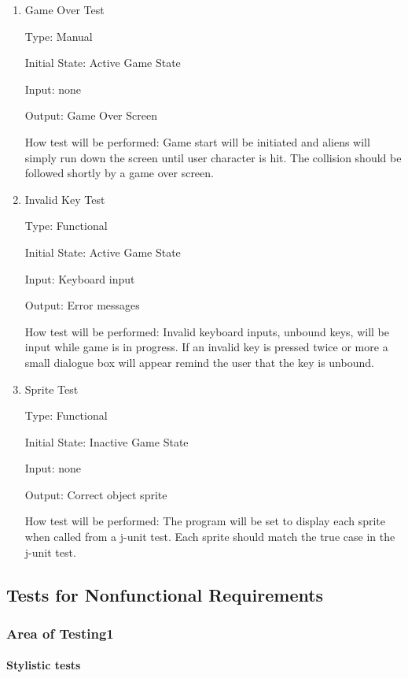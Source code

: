 \documentclass[12pt, titlepage]{article}
\begin{document}
\begin{enumerate}
\item{Game Over Test\\}

Type: Manual

Initial State: Active Game State 

Input: none

Output: Game Over Screen 

How test will be performed: Game start will be initiated and aliens will simply run down the screen until user character is hit. The collision should be followed shortly by a game over screen. 

\item{Invalid Key Test\\}

Type: Functional

Initial State: Active Game State 

Input: Keyboard input

Output: Error messages

How test will be performed: Invalid keyboard inputs, unbound keys, will be input while game is in progress. If an invalid key is pressed twice or more a small dialogue box will appear remind the user that the key is unbound. 

\item{Sprite Test\\}

Type: Functional 

Initial State: Inactive Game State

Input: none

Output: Correct object sprite

How test will be performed: The program will be set to display each sprite when called from a j-unit test. Each sprite should match the true case in the j-unit test. 

\end{enumerate}

\subsection{Tests for Nonfunctional Requirements}

\subsubsection{Area of Testing1}
		
\paragraph{Stylistic tests}
\end{document}

